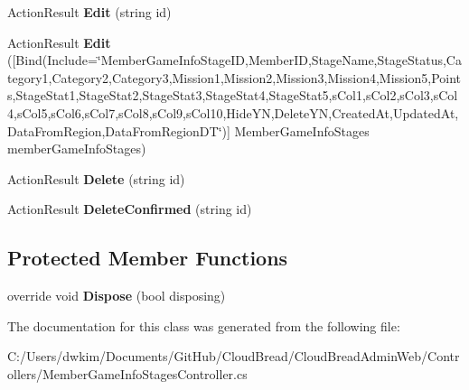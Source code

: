 \begin{DoxyCompactItemize}
\item 
Action\+Result {\bfseries Edit} (string id)\hypertarget{a00140_abd90e28cf38336c9a2a9c15dd0226eb8}{}\label{a00140_abd90e28cf38336c9a2a9c15dd0226eb8}

\item 
Action\+Result {\bfseries Edit} (\mbox{[}Bind(Include=\char`\"{}Member\+Game\+Info\+Stage\+ID,Member\+ID,Stage\+Name,Stage\+Status,Category1,Category2,Category3,Mission1,Mission2,Mission3,Mission4,Mission5,Points,Stage\+Stat1,Stage\+Stat2,Stage\+Stat3,Stage\+Stat4,Stage\+Stat5,s\+Col1,s\+Col2,s\+Col3,s\+Col4,s\+Col5,s\+Col6,s\+Col7,s\+Col8,s\+Col9,s\+Col10,Hide\+YN,Delete\+YN,Created\+At,Updated\+At,Data\+From\+Region,Data\+From\+Region\+DT\char`\"{})\mbox{]} Member\+Game\+Info\+Stages member\+Game\+Info\+Stages)\hypertarget{a00140_a45dd1554c0f5eafacddade4279d816c2}{}\label{a00140_a45dd1554c0f5eafacddade4279d816c2}

\item 
Action\+Result {\bfseries Delete} (string id)\hypertarget{a00140_a06a6927485c14f945472bbb880fcd206}{}\label{a00140_a06a6927485c14f945472bbb880fcd206}

\item 
Action\+Result {\bfseries Delete\+Confirmed} (string id)\hypertarget{a00140_a39023524e891224d1664f4b37e326715}{}\label{a00140_a39023524e891224d1664f4b37e326715}

\end{DoxyCompactItemize}
\subsection*{Protected Member Functions}
\begin{DoxyCompactItemize}
\item 
override void {\bfseries Dispose} (bool disposing)\hypertarget{a00140_ae26cdc9cb6457146e8687987c5c5bff5}{}\label{a00140_ae26cdc9cb6457146e8687987c5c5bff5}

\end{DoxyCompactItemize}


The documentation for this class was generated from the following file\+:\begin{DoxyCompactItemize}
\item 
C\+:/\+Users/dwkim/\+Documents/\+Git\+Hub/\+Cloud\+Bread/\+Cloud\+Bread\+Admin\+Web/\+Controllers/Member\+Game\+Info\+Stages\+Controller.\+cs\end{DoxyCompactItemize}
